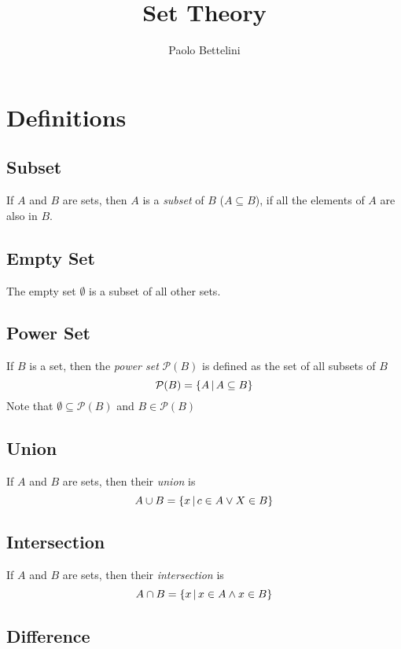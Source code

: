 \documentclass{article}
\title{Set Theory}
\author{Paolo Bettelini}
\date{}
\begin{document}
\maketitle
\tableofcontents
\pagebreak

\section{Definitions}

\subsection{Subset}

If \(A\) and \(B\) are sets, then \(A\) is a \textit{subset} of \(B\)
(\(A\subseteq B\)), if all the elements of \(A\) are also in \(B\).

\subsection{Empty Set}

The empty set \(\emptyset\) is a subset of all other sets.

\subsection{Power Set}

If \(B\) is a set, then the \textit{power set} \(\mathcal{P}(B)\)
is defined as the set of all subsets of \(B\)
\[
    \mathcal{P}(B)=\{A \,|\, A\subseteq B\}
\]
Note that \(\emptyset\subseteq\mathcal{P}(B)\) and \(B\in\mathcal{P}(B)\)

\subsection{Union}

If \(A\) and \(B\) are sets, then their \textit{union} is
\[
    A \cup B = \{x \,|\, c \in A \lor X \in B\}
\]

\subsection{Intersection}

If \(A\) and \(B\) are sets, then their \textit{intersection} is
\[
    A \cap B = \{x \,|\, x \in A \land x \in B\}
\]

\subsection{Difference}
\end{document}
